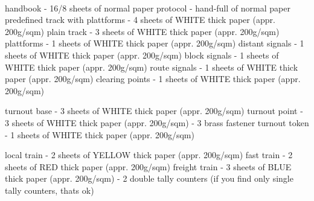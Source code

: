 \documentclass[
  paper=a4,
  version=3.25,
  pagesize=pdftex,
  twoside=false,
  DIV=12,
  headinclude=true,
  footinclude=false,
  toc=listof,
]{scrartcl}
\begin{document}

  \thispagestyle{empty}
  \begin{center}
    \\
    handbook - 16/8 sheets of normal paper
    protocol - hand-full of normal paper
    predefined track with plattforms - 4 sheets of WHITE thick paper (appr. 200g/sqm)
    plain track - 3 sheets of WHITE thick paper (appr. 200g/sqm)
    plattforms - 1 sheets of WHITE thick paper (appr. 200g/sqm)
    distant signals - 1 sheets of WHITE thick paper (appr. 200g/sqm)
    block signals - 1 sheets of WHITE thick paper (appr. 200g/sqm)
    route signals - 1 sheets of WHITE thick paper (appr. 200g/sqm)
    clearing points - 1 sheets of WHITE thick paper (appr. 200g/sqm)

    turnout base - 3 sheets of WHITE thick paper (appr. 200g/sqm)
    turnout point - 3 sheets of WHITE thick paper (appr. 200g/sqm)
                  - 3 brass fastener
    turnout token - 1 sheets of WHITE thick paper (appr. 200g/sqm)


    local train - 2 sheets of YELLOW thick paper (appr. 200g/sqm)
    fast train - 2 sheets of RED thick paper (appr. 200g/sqm)
    freight train  - 3 sheets of BLUE thick paper (appr. 200g/sqm)
    - 2 double tally counters (if you find only single tally counters, thats ok)
    
    \vfil\normalsize
  \end{center}
\end{document}
